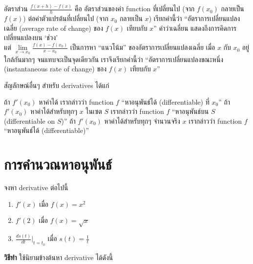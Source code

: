 \documentclass[
]{book}
\begin{document}
อัตราส่วน \(\displaystyle\frac{f(x+h) - f(x)}{h}\) คือ อัตราส่วนของค่า
function ที่เปลี่ยนไป (จาก \(f(x_0)\) กลายเป็น \(f(x)\)) ต่อค่าตัวแปรต้นที่เปลี่ยนไป
(จาก \(x_0\) กลายเป็น \(x\)) เรียกคำนี้ว่า ``อัตราการเปลี่ยนแปลงเฉลี่ย (average
rate of change) ของ \(f(x)\) เทียบกับ \(x\)'' คำว่าเฉลี่ยน
แสดงถึงการคิดการเปลี่ยนแปลงบน `ช่วง'\\
แต่
\(\displaystyle\underset{x \rightarrow x_0}{\lim}\frac{f(x) - f(x_0)}{x-x_0}\)
เป็นการหา ``แนวโน้ม'' ของอัตราการเปลี่ยนแปลงเฉลี่ย เมื่อ \(x\) กับ \(x_0\)
อยู่ใกล้กันมากๆ จนแทบจะเป็นจุดเดียวกัน เราจึงเรียกค่านี้ว่า ``อัตราการเปลี่ยนแปลงขณะหนึ่ง
(instantaneous rate of change) ของ \(f(x)\) เทียบกับ \(x\)''

สัญลักษณ์อื่นๆ สำหรับ derivatives ได้แก่

ถ้า \(f'(x_0)\) หาค่าได้ เรากล่าวว่า function \(f\) ``หาอนุพันธ์ได้
(differentiable) ที่ \(x_0\)'' ถ้า \(f'(x_0)\) หาค่าได้สำหรับทุกๆ \(x\) ในเซต
\(S\) เรากล่าวว่า function \(f\) ``หาอนุพันธ์บน \(S\) (differentiable on
\(S\))'' ถ้า \(f'(x_0)\) หาค่าได้สำหรับทุกๆ จำนวนจริง \(x\) เรากล่าวว่า function
\(f\) ``หาอนุพันธ์ได้ (differentiable)''

\section{การคำนวณหาอนุพันธ์}\label{uxe01uxe32uxe23uxe04uxe33uxe19uxe27uxe13uxe2buxe32uxe2duxe19uxe1euxe19uxe18}

จงหา derivative ต่อไปนี้

\begin{enumerate}
\def\labelenumi{(\arabic{enumi})}
\item
  \(f'(x)\) เมื่อ \(f(x) = x^2\)
\item
  \(f'(2)\) เมื่อ \(f(x) = \sqrt{x}\)
\item
  \(\frac{ds(t)}{dt}|_{t=t_0}\) เมื่อ \(s(t) = \frac{1}{t}\)
\end{enumerate}

\textbf{วิธีทำ} ใช้นิยามข้างต้นหา derivative ได้ดังนี้
\end{document}
